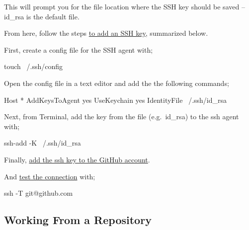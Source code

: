 \documentclass[]{article}
\newenvironment{Shaded}{\begin{snugshade}}{\end{snugshade}}
\newcommand{\FunctionTok}[1]{\textcolor[rgb]{0.00,0.00,0.00}{#1}}
\newcommand{\ExtensionTok}[1]{#1}
\newcommand{\NormalTok}[1]{#1}
\begin{document}
This will prompt you for the file location where the SSH key should be
saved -- id\_rsa is the default file.

From here, follow the steps
\href{https://help.github.com/articles/generating-a-new-ssh-key-and-adding-it-to-the-ssh-agent/}{\color{blue}to add an SSH key},
summarized below.

First, create a config file for the SSH agent with;

\begin{Shaded}
\begin{Highlighting}[]
\FunctionTok{touch}\NormalTok{ ~/.ssh/config}
\end{Highlighting}
\end{Shaded}

Open the config file in a text editor and add the the following
commands;

\begin{Shaded}
\begin{Highlighting}[]
\ExtensionTok{Host}\NormalTok{ *}
 \ExtensionTok{AddKeysToAgent}\NormalTok{ yes}
 \ExtensionTok{UseKeychain}\NormalTok{ yes}
 \ExtensionTok{IdentityFile}\NormalTok{ ~/.ssh/id_rsa}
\end{Highlighting}
\end{Shaded}

Next, from Terminal, add the key from the file (e.g.~id\_rsa) to the ssh
agent with;

\begin{Shaded}
\begin{Highlighting}[]
\FunctionTok{ssh-add}\NormalTok{ -K ~/.ssh/id_rsa}
\end{Highlighting}
\end{Shaded}

Finally,
\href{https://help.github.com/articles/adding-a-new-ssh-key-to-your-github-account/}{\color{blue}add the ssh key to the GitHub account}.

And
\href{https://help.github.com/articles/testing-your-ssh-connection/}{\color{blue}test the connection}
with;

\begin{Shaded}
\begin{Highlighting}[]
\FunctionTok{ssh}\NormalTok{ -T git@github.com}
\end{Highlighting}
\end{Shaded}

\subsection{Working From a Repository}
\end{document}

